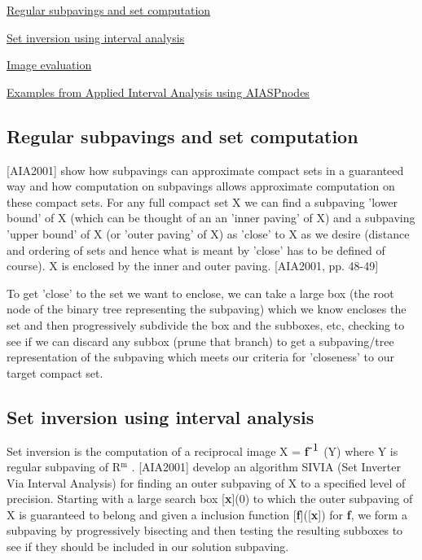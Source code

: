 
\begin{DoxyItemize}
\item \hyperlink{AIASubPavings_AIAsec_setcomputation}{\-Regular subpavings and set computation}
\item \hyperlink{AIASubPavings_AIAsec_SIVIA}{\-Set inversion using interval analysis}
\item \hyperlink{AIASubPavings_AIAsec_imageSp}{\-Image evaluation}
\item \hyperlink{AIASubPavings_AIAsec_examples}{\-Examples from \-Applied \-Interval \-Analysis using \-A\-I\-A\-S\-Pnodes}
\end{DoxyItemize}



\hypertarget{AIASubPavings_AIAsec_setcomputation}{}\subsection{\-Regular subpavings and set computation}\label{AIASubPavings_AIAsec_setcomputation}
\mbox{[}\-A\-I\-A2001\mbox{]} show how subpavings can approximate compact sets in a guaranteed way and how computation on subpavings allows approximate computation on these compact sets. \-For any full compact set \-X we can find a subpaving 'lower bound' of \-X (which can be thought of an an 'inner paving' of \-X) and a subpaving 'upper bound' of \-X (or \label{AIASubPavings_outerpaving}%
\hypertarget{AIASubPavings_outerpaving}{}%
'outer paving' of \-X) as 'close' to \-X as we desire (distance and ordering of sets and hence what is meant by 'close' has to be defined of course). \-X is enclosed by the inner and outer paving. \mbox{[}\-A\-I\-A2001, pp. 48-\/49\mbox{]}

\-To get 'close' to the set we want to enclose, we can take a large box (the root node of the binary tree representing the subpaving) which we know encloses the set and then progressively subdivide the box and the subboxes, etc, checking to see if we can discard any subbox (prune that branch) to get a subpaving/tree representation of the subpaving which meets our criteria for 'closeness' to our target compact set.



\hypertarget{AIASubPavings_AIAsec_SIVIA}{}\subsection{\-Set inversion using interval analysis}\label{AIASubPavings_AIAsec_SIVIA}
\-Set inversion is the computation of a reciprocal image \-X = {\bfseries f}$^{\mbox{-\/1}}$ (\-Y) where \-Y is regular subpaving of \-R$^{\mbox{m}}$ . \mbox{[}\-A\-I\-A2001\mbox{]} develop an algorithm \-S\-I\-V\-I\-A (\-Set \-Inverter \-Via \-Interval \-Analysis) for finding an outer subpaving of \-X to a specified level of precision. \-Starting with a large search box \mbox{[}{\bfseries x}\mbox{]}(0) to which the outer subpaving of \-X is guaranteed to belong and given a inclusion function \mbox{[}{\bfseries f}\mbox{]}(\mbox{[}{\bfseries x}\mbox{]}) for {\bfseries f}, we form a subpaving by progressively bisecting and then testing the resulting subboxes to see if they should be included in our solution subpaving.

